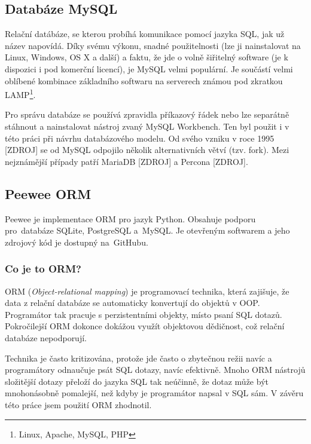 \subsection{Databáze MySQL}

\indent

Relační datábáze, se kterou probíhá komunikace pomocí jazyka SQL, jak už název napovídá.
Díky svému výkonu, snadné použitelnosti (lze ji nainstalovat na Linux, Windows, OS X a další) a faktu,
že jde o volně šiřitelný software (je k dispozici i pod komerční licencí),
je MySQL velmi populární. Je součástí velmi oblíbené kombinace
základního softwaru na serverech známou pod zkratkou LAMP\footnote{Linux, Apache, MySQL, PHP}.

\medskip

Pro správu databáze se používá zpravidla příkazový řádek nebo lze separátně stáhnout
a nainstalovat nástroj zvaný MySQL Workbench. Ten byl použit i v této práci při návrhu databázového modelu.
Od svého vzniku v roce 1995 [ZDROJ] se od MySQL odpojilo několik alternativních větví (tzv. fork).
Mezi nejznámější případy patří MariaDB [ZDROJ] a Percona [ZDROJ].

\subsection{Peewee ORM}

\indent

Peewee je implementace ORM pro jazyk Python. Obsahuje podporu pro~databáze SQLite,
PostgreSQL a~MySQL. Je otevřeným softwarem a jeho zdrojový kód je dostupný na~GitHubu.

\subsubsection{Co je to ORM?}

\indent

ORM (\textit{Object-relational mapping}) je programovací technika, která zajišuje, že data z relační databáze
se automaticky konvertují do objektů v OOP. Programátor tak pracuje s perzistentními objekty,
místo psaní SQL dotazů. Pokročilejší ORM dokonce dokážou využít objektovou dědičnost, což relační databáze nepodporují.

\medskip

Technika je často kritizována, protože jde často o zbytečnou režii navíc
a programátory odnaučuje psát SQL dotazy, navíc efektivně.
Mnoho ORM nástrojů složitější dotazy přeloží do jazyka SQL tak neúčinně,
že dotaz může být mnohonásobně pomalejší, než kdyby je programátor napsal v SQL sám.
V závěru této práce jsem použití ORM zhodnotil.


